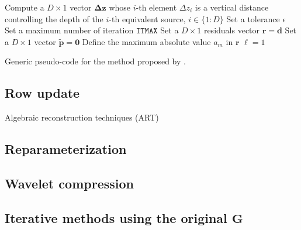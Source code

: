 \begin{algorithm}
	\Input{}
	Compute a $D \times 1$ vector $\boldsymbol{\Delta}\mathbf{z}$ whose $i$-th element $\Delta z_{i}$ 
	is a vertical distance controlling the depth of the $i$-th equivalent source, $i \in \{1:D\}$ \;
	Set a tolerance $\epsilon$ \;
	Set a maximum number of iteration $\mathtt{ITMAX}$ \;
	Set a $D \times 1$ residuals vector $\mathbf{r} = \mathbf{d}$ \;
	Set a $D \times 1$ vector $\tilde{\mathbf{p}} = \mathbf{0}$ \;
	Define the maximum absolute value $a_{m}$ in $\mathbf{r}$ \;
	$\ell = 1$ \;
	\caption{Generic pseudo-code for the method proposed by \cite{cordell1992}.}
	\label{alg:C92}
\end{algorithm}



\subsection{Row update}

Algebraic reconstruction techniques (ART) \cite{sluis-vorst1987}

\cite{mendonca-silva1994}

\subsection{Reparameterization}

\cite{barnes-lumley_2011}

\cite{oliveirajr-etal2013}

\cite{mendonca-2020}

\subsection{Wavelet compression}

\cite{li-oldenburg_2010}

\subsection{Iterative methods using the original $\mathbf{G}$}

